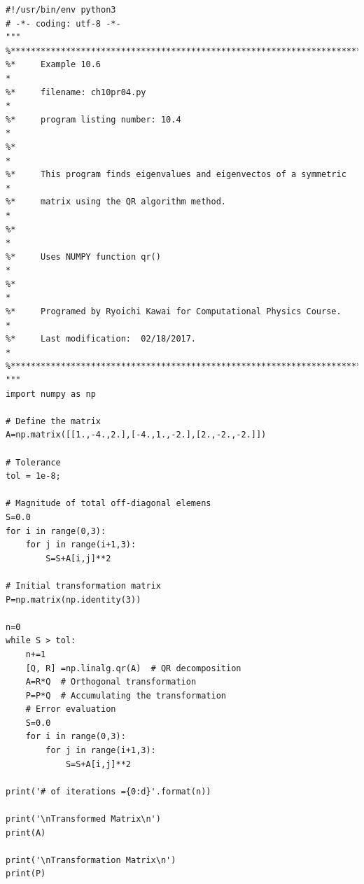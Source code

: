 {\bigskip
\noindent
\program
\footnotesize
\begin{verbatim}
#!/usr/bin/env python3
# -*- coding: utf-8 -*-
"""
%**************************************************************************
%*     Example 10.6                                                       *
%*     filename: ch10pr04.py                                              *
%*     program listing number: 10.4                                       *
%*                                                                        *
%*     This program finds eigenvalues and eigenvectos of a symmetric      *
%*     matrix using the QR algorithm method.                              *
%*                                                                        *
%*     Uses NUMPY function qr()                                           *
%*                                                                        *
%*     Programed by Ryoichi Kawai for Computational Physics Course.       *
%*     Last modification:  02/18/2017.                                    *
%**************************************************************************
"""
import numpy as np

# Define the matrix
A=np.matrix([[1.,-4.,2.],[-4.,1.,-2.],[2.,-2.,-2.]])

# Tolerance
tol = 1e-8;

# Magnitude of total off-diagonal elemens
S=0.0
for i in range(0,3):
    for j in range(i+1,3):
        S=S+A[i,j]**2

# Initial transformation matrix
P=np.matrix(np.identity(3))

n=0
while S > tol:
    n+=1
    [Q, R] =np.linalg.qr(A)  # QR decomposition
    A=R*Q  # Orthogonal transformation
    P=P*Q  # Accumulating the transformation
    # Error evaluation
    S=0.0
    for i in range(0,3):
        for j in range(i+1,3):
            S=S+A[i,j]**2

print('# of iterations ={0:d}'.format(n))

print('\nTransformed Matrix\n')
print(A)

print('\nTransformation Matrix\n')
print(P)
\end{verbatim}
\normalsize


}

